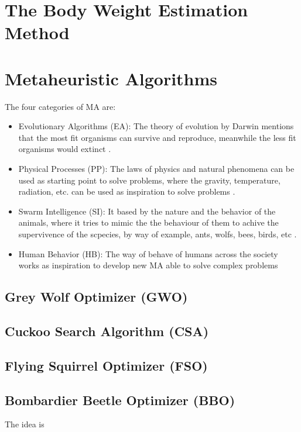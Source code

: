 \section*{The Body Weight Estimation Method}

\blindtext


\section*{Metaheuristic Algorithms}


  The four categories of MA are:

  \begin{itemize}
    \item Evolutionary Algorithms (EA): The theory of evolution by Darwin mentions that the 
      most fit organisms can survive and reproduce, meanwhile the less fit 
      organisms would extinct \cite{garg2010evolutionary}.
    
    \item Physical Processes (PP): The laws of physics and natural phenomena can be used as
      starting point to solve problems, where the gravity, temperature, radiation, etc. can be 
      used as inspiration to solve problems \cite{agrawal2021metaheuristic}.

    \item Swarm Intelligence (SI): It based by the nature and the behavior of the animals, 
      where it tries to mimic the the behaviour of them to achive the supervivence of the scpecies,
      by way of example, ants, wolfs, bees, birds, etc \cite{almufti2022lion}.

    \item Human Behavior (HB): The way of behave of humans across the society works as inspiration to 
      develop new MA able to solve complex problems \cite{agrawal2021metaheuristic}
        
  \end{itemize}






\subsection*{Grey Wolf Optimizer (GWO)} \blindtext

\subsection*{Cuckoo Search Algorithm (CSA)} \blindtext

\subsection*{Flying Squirrel Optimizer (FSO)} \blindtext


\subsection*{Bombardier Beetle Optimizer (BBO)} The idea is \cite{shehadeh2025bombardier} \blindtext




